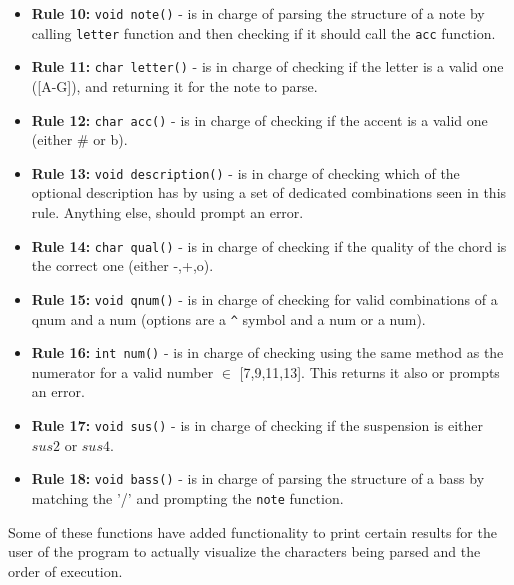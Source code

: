 \documentclass{article}
\begin{document}
\begin{itemize}
    \item \textbf{Rule 10:} \texttt{void note()} - is in charge of parsing the structure of a note by calling \texttt{letter} function and then checking if it should call the \texttt{acc} function.
    \item \textbf{Rule 11:} \texttt{char letter()} - is in charge of checking if the letter is a valid one ([A-G]), and returning it for the note to parse.
    \item \textbf{Rule 12:} \texttt{char acc()} - is in charge of checking if the accent is a valid one (either \# or b).
    \item \textbf{Rule 13:} \texttt{void description()} - is in charge of checking which of the optional description has by using a set of dedicated combinations seen in this rule. Anything else, should prompt an error.
    \item \textbf{Rule 14:} \texttt{char qual()} - is in charge of checking if the quality of the chord is the correct one (either -,+,o). 
    \item \textbf{Rule 15:} \texttt{void qnum()} - is in charge of checking for valid combinations of a qnum and a num (options are a \texttt{\^{}} symbol and a num or a num).
    \item \textbf{Rule 16:} \texttt{int num()} - is in charge of checking using the same method as the numerator for a valid number $\in$ [7,9,11,13]. This returns it also or prompts an error.
    \item \textbf{Rule 17:} \texttt{void sus()} - is in charge of checking if the suspension is either $sus2$ or $sus4$.
    \item \textbf{Rule 18:} \texttt{void bass()} - is in charge of parsing the structure of a bass by matching the '/' and prompting the \texttt{note} function.
\end{itemize}
\indent Some of these functions have added functionality to print certain results for the user of the program to actually visualize the characters being parsed and the order of execution.
\end{document}
